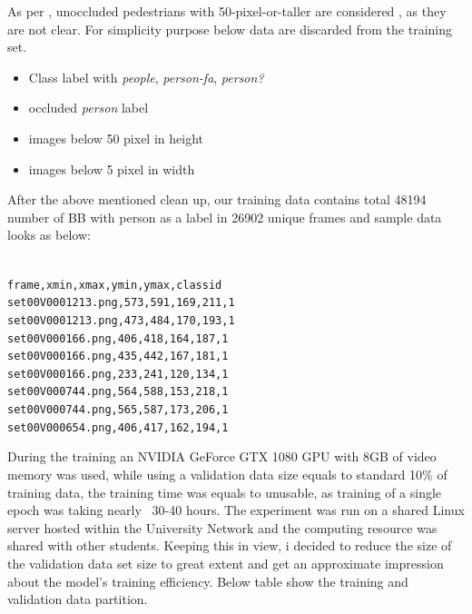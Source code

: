 As per \cite{walk2010new}, unoccluded pedestrians with 50-pixel-or-taller are considered , as they are not clear. For simplicity purpose below data are discarded from the training set.
\begin{itemize}
	\item Class label with \textit{people}, \textit{person-fa}, \textit{person?}
	\item occluded \textit{person} label
	\item images below 50 pixel in height
	\item images below 5 pixel in width
\end{itemize}

After the above mentioned clean up, our training data contains total 48194 number of BB with person as a label in 26902 unique frames and sample data looks as below:
\begin{center}
\texttt{  \\
frame,xmin,xmax,ymin,ymax,class\textunderscore id \\
set00\textunderscore V000\textunderscore 1213.png,573,591,169,211,1 \\
set00\textunderscore V000\textunderscore 1213.png,473,484,170,193,1 \\
set00\textunderscore V000\textunderscore 166.png,406,418,164,187,1 \\
set00\textunderscore V000\textunderscore 166.png,435,442,167,181,1 \\
set00\textunderscore V000\textunderscore 166.png,233,241,120,134,1 \\
set00\textunderscore V000\textunderscore 744.png,564,588,153,218,1 \\
set00\textunderscore V000\textunderscore 744.png,565,587,173,206,1 \\
set00\textunderscore V000\textunderscore 654.png,406,417,162,194,1 \\
}
\end{center}

During the training an NVIDIA GeForce GTX 1080 GPU with 8GB of video memory was used, while using a validation data size equals to standard 10\% of training data, the training time was equals to unusable, as training of a single epoch was taking nearly ~30-40 hours. The experiment was run on a shared Linux server hosted within the University Network and the computing resource was shared with other students. Keeping this in view, i decided to reduce the size of the validation data set size to great extent and get an approximate impression about the model's training efficiency. Below table show the training and validation data partition.

